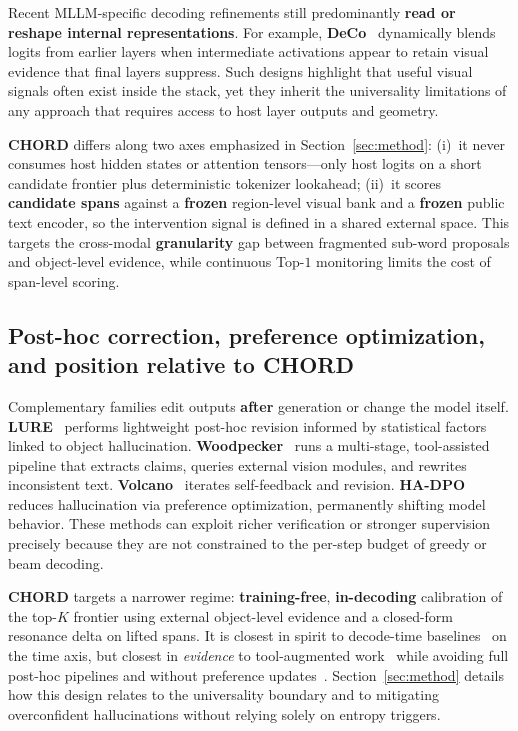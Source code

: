 Recent MLLM-specific decoding refinements still predominantly \textbf{read or reshape internal representations}. For example, \textbf{DeCo}~\cite{wang2024deco} dynamically blends logits from earlier layers when intermediate activations appear to retain visual evidence that final layers suppress. Such designs highlight that useful visual signals often exist inside the stack, yet they inherit the universality limitations of any approach that requires access to host layer outputs and geometry.

\textbf{CHORD} differs along two axes emphasized in Section~\ref{sec:method}: (i)~it never consumes host hidden states or attention tensors---only host logits on a short candidate frontier plus deterministic tokenizer lookahead; (ii)~it scores \textbf{candidate spans} against a \textbf{frozen} region-level visual bank and a \textbf{frozen} public text encoder, so the intervention signal is defined in a shared external space. This targets the cross-modal \textbf{granularity} gap between fragmented sub-word proposals and object-level evidence, while continuous Top-$1$ monitoring limits the cost of span-level scoring.

\subsection{Post-hoc correction, preference optimization, and position relative to CHORD}

Complementary families edit outputs \textbf{after} generation or change the model itself. \textbf{LURE}~\cite{zhou2024lure} performs lightweight post-hoc revision informed by statistical factors linked to object hallucination. \textbf{Woodpecker}~\cite{yin2024woodpecker} runs a multi-stage, tool-assisted pipeline that extracts claims, queries external vision modules, and rewrites inconsistent text. \textbf{Volcano}~\cite{lee2024volcano} iterates self-feedback and revision. \textbf{HA-DPO}~\cite{zhao2023hadpo} reduces hallucination via preference optimization, permanently shifting model behavior. These methods can exploit richer verification or stronger supervision precisely because they are not constrained to the per-step budget of greedy or beam decoding.

\textbf{CHORD} targets a narrower regime: \textbf{training-free}, \textbf{in-decoding} calibration of the top-$K$ frontier using external object-level evidence and a closed-form resonance delta on lifted spans. It is closest in spirit to decode-time baselines~\cite{leng2024vcd,huang2024opera,chuang2024dola,wang2024deco} on the time axis, but closest in \emph{evidence} to tool-augmented work~\cite{yin2024woodpecker} while avoiding full post-hoc pipelines and without preference updates~\cite{zhao2023hadpo}. Section~\ref{sec:method} details how this design relates to the universality boundary and to mitigating overconfident hallucinations without relying solely on entropy triggers.

